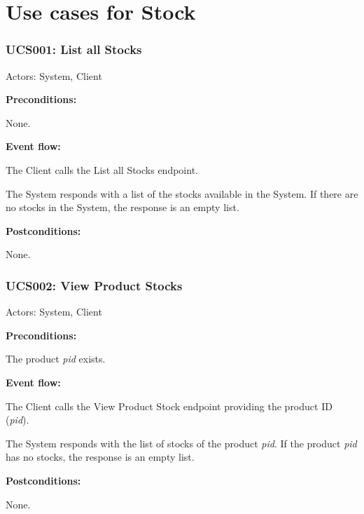 \section{Use cases for Stock}

\begin{ucbox}{\subsubsection{UCS001: List all Stocks}}
\label{UCS001}

Actors: System, Client

\textbf{Preconditions:}

\ucitem None.

\textbf{Event flow:}

\ucitem The Client calls the List all Stocks endpoint.

\ucitem The System responds with a list of the stocks available in the System. If there are no stocks in the System, the response is an empty list.

\textbf{Postconditions:}

\ucitem None.

\end{ucbox}

\begin{ucbox}{\subsubsection{UCS002: View Product Stocks}}
\label{UCS002}

Actors: System, Client

\textbf{Preconditions:}

\ucitem The product \textit{pid} exists.

\textbf{Event flow:}

\ucitem The Client calls the View Product Stock endpoint providing the product ID (\textit{pid}).

\ucitem The System responds with the list of stocks of the product \textit{pid}. If the product \textit{pid} has no stocks, the response is an empty list.

\textbf{Postconditions:}

\ucitem None.

\end{ucbox}

